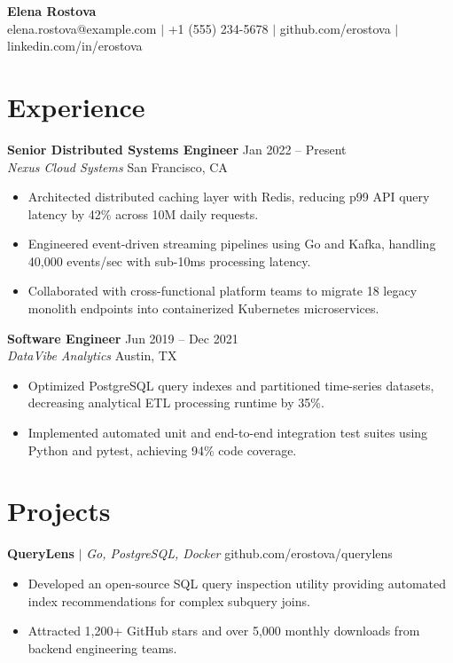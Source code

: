 \documentclass[letterpaper,10pt]{article}
\newcommand{\resumeItem}[1]{\item\small{{#1}}}
\begin{document}
\begin{center}
    {\Huge \textbf{Elena Rostova}} \\ \vspace{3pt}
    \small elena.rostova@example.com $|$ +1 (555) 234-5678 $|$ github.com/erostova $|$ linkedin.com/in/erostova
\end{center}

\section{Experience}
\textbf{Senior Distributed Systems Engineer} \hfill Jan 2022 -- Present \\
\textit{Nexus Cloud Systems} \hfill San Francisco, CA
\begin{itemize}
    \resumeItem{Architected distributed caching layer with Redis, reducing p99 API query latency by 42\% across 10M daily requests.}
    \resumeItem{Engineered event-driven streaming pipelines using Go and Kafka, handling 40,000 events/sec with sub-10ms processing latency.}
    \resumeItem{Collaborated with cross-functional platform teams to migrate 18 legacy monolith endpoints into containerized Kubernetes microservices.}
\end{itemize}

\vspace{4pt}
\textbf{Software Engineer} \hfill Jun 2019 -- Dec 2021 \\
\textit{DataVibe Analytics} \hfill Austin, TX
\begin{itemize}
    \resumeItem{Optimized PostgreSQL query indexes and partitioned time-series datasets, decreasing analytical ETL processing runtime by 35\%.}
    \resumeItem{Implemented automated unit and end-to-end integration test suites using Python and pytest, achieving 94\% code coverage.}
\end{itemize}

\section{Projects}
\textbf{QueryLens} $|$ \emph{Go, PostgreSQL, Docker} \hfill github.com/erostova/querylens
\begin{itemize}
    \resumeItem{Developed an open-source SQL query inspection utility providing automated index recommendations for complex subquery joins.}
    \resumeItem{Attracted 1,200+ GitHub stars and over 5,000 monthly downloads from backend engineering teams.}
\end{itemize}
\end{document}
